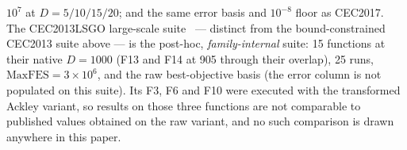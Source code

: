 $10^{7}$ at $D = 5/10/15/20$; and the same error basis and $10^{-8}$
floor as CEC2017.
The CEC2013LSGO large-scale suite~\cite{li2013lsgo} --- distinct from
the bound-constrained CEC2013 suite above --- is the post-hoc,
\emph{family-internal} suite: 15 functions at their native $D = 1000$
(F13 and F14 at 905 through their overlap), 25 runs,
$\mathrm{MaxFES} = 3 \times 10^{6}$, and the raw best-objective basis
(the error column is not populated on this suite). Its F3, F6 and F10
were executed with the transformed Ackley variant, so results on those
three functions are not comparable to published values obtained on the
raw variant, and no such comparison is drawn anywhere in this paper.

